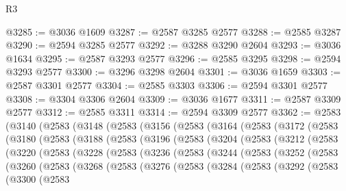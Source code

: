 \begin{lexlean}{R3}
\begin{coremodule}
@3285 := @3036 @1609
@3287 := @2587 @3285 @2577
@3288 := @2585 @3287
@3290 := @2594 @3285 @2577
@3292 := @3288 @3290 @2604
@3293 := @3036 @1634
@3295 := @2587 @3293 @2577
@3296 := @2585 @3295
@3298 := @2594 @3293 @2577
@3300 := @3296 @3298 @2604
@3301 := @3036 @1659
@3303 := @2587 @3301 @2577
@3304 := @2585 @3303
@3306 := @2594 @3301 @2577
@3308 := @3304 @3306 @2604
@3309 := @3036 @1677
@3311 := @2587 @3309 @2577
@3312 := @2585 @3311
@3314 := @2594 @3309 @2577
@3362 := @2583
    (@3140
      (@2583
        (@3148
          (@2583
            (@3156
              (@2583
                (@3164
                  (@2583
                    (@3172
                      (@2583
                        (@3180
                          (@2583
                            (@3188
                              (@2583
                                (@3196
                                  (@2583
                                    (@3204
                                      (@2583
                                        (@3212
                                          (@2583
                                            (@3220
                                              (@2583
                                                (@3228
                                                  (@2583
                                                    (@3236
                                                      (@2583
                                                        (@3244
                                                          (@2583
                                                            (@3252
                                                              (@2583
                                                                (@3260
                                                                  (@2583
                                                                    (@3268
                                                                      (@2583
                                                                        (@3276
                                                                          (@2583
                                                                            (@3284
                                                                              (@2583
                                                                                (@3292
                                                                                  (@2583
                                                                                    (@3300
                                                                                      (@2583

\end{coremodule}
\end{lexlean}
